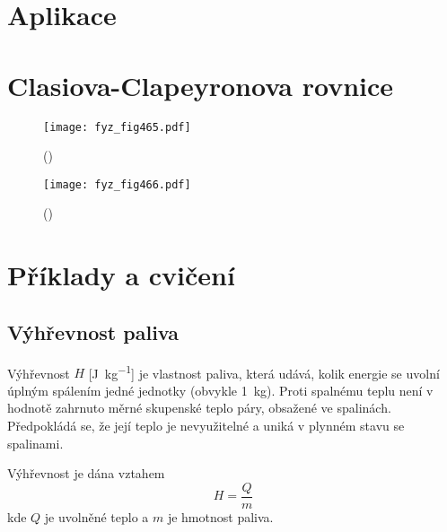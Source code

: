   \section{Aplikace}\label{fyz:IchapXLVsecII}
  \section{Clasiova-Clapeyronova rovnice}\label{fyz:IchapXLVsecIII}
  
    \begin{figure}[ht!] %
      \centering
      \texttt{[image: fyz\_fig465.pdf]}
      \caption{ 
              (\cite[s.~707]{Feynman01})}
      \label{fyz:fig465}
    \end{figure}

    \begin{figure}[ht!] %
      \centering
      \texttt{[image: fyz\_fig466.pdf]}
      \caption{ 
              (\cite[s.~707]{Feynman01})}
      \label{fyz:fig466}
    \end{figure}
  \section{Příklady a cvičení}\label{fyz:IchapXLVsecIV}
    \subsection{Výhřevnost paliva}\label{fyz:IchapXLVsecIVssecI}
      Výhřevnost \(H\) [\si{\joule\per\kg}] je vlastnost paliva, která udává, kolik energie se
      uvolní úplným spálením jedné jednotky (obvykle \SI{1}{\kg}). Proti spalnému teplu není v
      hodnotě zahrnuto měrné skupenské teplo páry, obsažené ve spalinách. Předpokládá se, že její
      teplo je nevyužitelné a uniká v plynném stavu se spalinami.

      Výhřevnost je dána vztahem
      \begin{equation*}
        H=\dfrac{Q}{m}
      \end{equation*}
      kde \(Q\) je uvolněné teplo a \(m\) je hmotnost paliva. 

      
      
      
      
    
